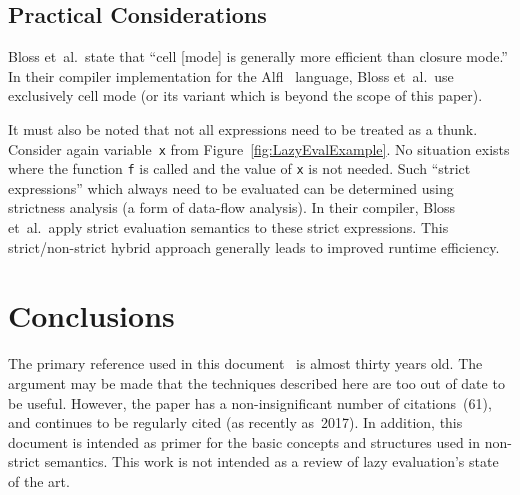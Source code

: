 \documentclass[11pt]{article}
\begin{document}
\subsection{Practical Considerations}

Bloss et~al.\ state that ``cell [mode] is generally more efficient than closure mode.''  In their compiler implementation for the Alfl~\cite{Alfl} language, Bloss et~al.\ use exclusively cell mode (or its variant which is beyond the scope of this paper).

It must also be noted that not all expressions need to be treated as a thunk.  Consider again variable~\texttt{x} from Figure~\ref{fig:LazyEvalExample}.  No situation exists where the function \texttt{f} is called and the value of \texttt{x} is not needed.  Such ``strict expressions'' which always need to be evaluated can be determined using strictness analysis (a form of data-flow analysis).  In their compiler, Bloss et~al.\ apply strict evaluation semantics to these strict expressions.  This strict/non-strict hybrid approach generally leads to improved runtime efficiency.

\section{Conclusions}\label{sec:Conclusions}

The primary reference used in this document~\cite{Bloss:1988} is almost thirty years old.  The argument may be made that the techniques described here are too out of date to be useful.  However, the paper has a non-insignificant number of citations~(61), and continues to be regularly cited (as recently as~2017).  In addition, this document is intended as primer for the basic concepts and structures used in non-strict semantics. This work is not intended as a review of lazy evaluation's state of the art.



\end{document}
